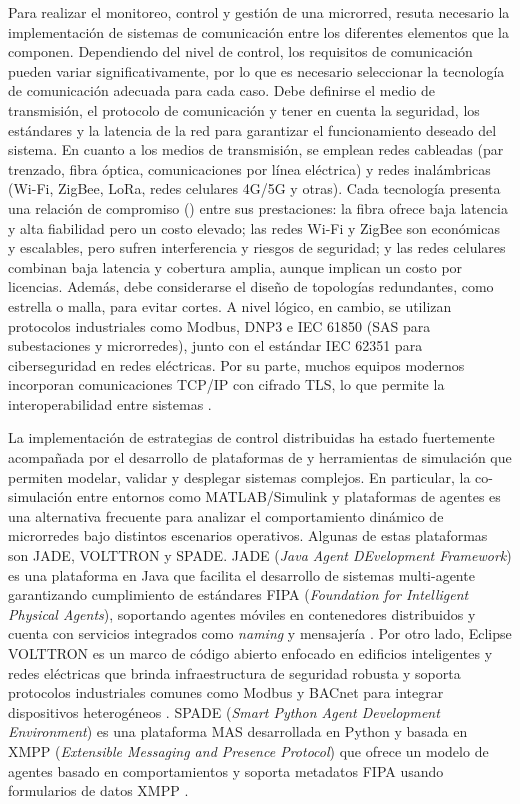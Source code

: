 Para realizar el monitoreo, control y gestión de una microrred, resuta necesario la implementación de sistemas de comunicación entre los diferentes elementos que la componen. Dependiendo del nivel de control, los requisitos de comunicación pueden variar significativamente, por lo que es necesario seleccionar la tecnología de comunicación adecuada para cada caso. Debe definirse el medio de transmisión, el protocolo de comunicación y tener en cuenta la seguridad, los estándares y la latencia de la red para garantizar el funcionamiento deseado del sistema.
En cuanto a los medios de transmisión, se emplean redes cableadas (par trenzado, fibra óptica, comunicaciones por línea eléctrica) y redes inalámbricas (Wi-Fi, ZigBee, LoRa, redes celulares 4G/5G y otras). Cada tecnología presenta una relación de compromiso () entre sus prestaciones: la fibra ofrece baja latencia y alta fiabilidad pero un costo elevado; las redes Wi-Fi y ZigBee son económicas y escalables, pero sufren interferencia y riesgos de seguridad; y las redes celulares combinan baja latencia y cobertura amplia, aunque implican un costo por licencias. Además, debe considerarse el diseño de topologías redundantes, como estrella o malla, para evitar cortes. A nivel lógico, en cambio, se utilizan protocolos industriales como Modbus, DNP3 e IEC 61850 (SAS para subestaciones y microrredes), junto con el estándar IEC 62351 para ciberseguridad en redes eléctricas. Por su parte, muchos equipos modernos incorporan comunicaciones TCP/IP con cifrado TLS, lo que permite la interoperabilidad entre sistemas \cite{9023471_communication_microgrid}.

La implementación de estrategias de control distribuidas ha estado fuertemente acompañada por el desarrollo de plataformas de  y herramientas de simulación que permiten modelar, validar y desplegar sistemas complejos. En particular, la co-simulación entre entornos como MATLAB/Simulink y plataformas de agentes es una alternativa frecuente para analizar el comportamiento dinámico de microrredes bajo distintos escenarios operativos. Algunas de estas plataformas son JADE, VOLTTRON y SPADE. JADE (\textit{Java Agent DEvelopment Framework}) es una plataforma en Java que facilita el desarrollo de sistemas multi-agente garantizando cumplimiento de estándares FIPA (\textit{Foundation for Intelligent Physical Agents}), soportando agentes móviles en contenedores distribuidos y cuenta con servicios integrados como \textit{naming} y mensajería \cite{bellifemine1999jade}. Por otro lado, Eclipse VOLTTRON es un marco de código abierto enfocado en edificios inteligentes y redes eléctricas que brinda infraestructura de seguridad robusta y soporta protocolos industriales comunes como Modbus y BACnet para integrar dispositivos heterogéneos \cite{volttron_data_management}. SPADE (\textit{Smart Python Agent Development Environment}) es una plataforma MAS desarrollada en Python y basada en XMPP (\textit{Extensible Messaging and Presence Protocol}) que ofrece un modelo de agentes basado en comportamientos y soporta metadatos FIPA usando formularios de datos XMPP \cite{spade_docs}.

